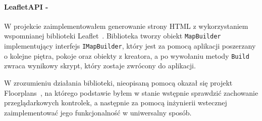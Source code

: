 \paragraph{LeafletAPI -}
W projekcie zaimplementowałem generowanie strony HTML z wykorzystaniem wspomnianej biblioteki Leaflet~\cite{leafletGithub}.
Biblioteka tworzy obiekt \verb|MapBuilder| implementujący interfejs \verb|IMapBuilder|, który jest 
za pomocą aplikacji poszerzany o kolejne piętra, pokoje oraz obiekty z kreatora, a po wywołaniu 
metody \verb|Build| zwraca wynikowy skrypt, który zostaje zwrócony do aplikacji.

W zrozumieniu działania biblioteki, nieopisaną pomocą okazał się projekt Floorplans~\cite{floorplansGithub},
na którego podstawie byłem w stanie wstępnie sprawdzić zachowanie przeglądarkowych kontrolek, 
a następnie za pomocą inżynierii wstecznej zaimplementować jego funkcjonalność w uniwersalny sposób.


